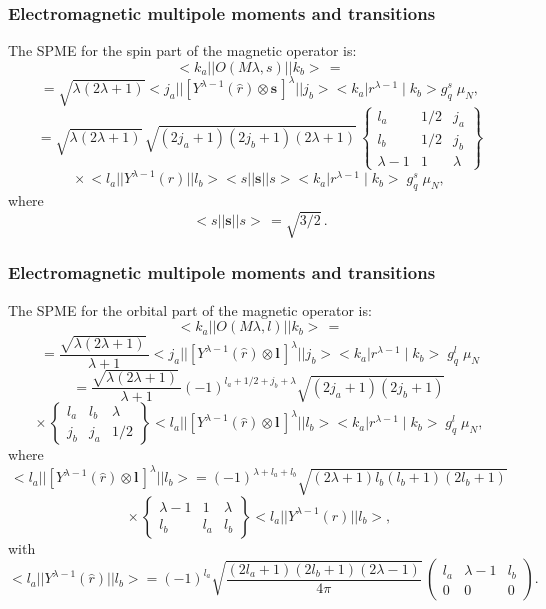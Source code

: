 \documentclass[compress]{beamer}
\renewcommand{\vec}[1]{\mathbf{#1}}
\renewcommand{\vec}[1]{\boldsymbol{#1}}
\begin{document}
\frame
{
\frametitle{Electromagnetic multipole moments and transitions}
\begin{small}
{\scriptsize
The SPME for the spin part of the magnetic operator is:
\[
<k_{a}||O(M\lambda ,s)||k_{b}>\, =
\]
\[
= \sqrt{\lambda (2\lambda +1)}<j_{a}||[Y^{\lambda -1}(\hat{r})\otimes\vec{s}\,]^{\lambda }||j_{b}>
<k_{a}|r^{\lambda -1}\mid k_{b}>g^{s}_{q} \; \mu _{N},
\]
\[
= \sqrt{\lambda (2\lambda +1)}\, \sqrt{(2j_{a}+1)(2j_{b}+1)(2\lambda +1)}\,
  \left\{\begin{array}{ccc}  {l _{a}}&  {1/2} & {j_{a}}\\  {l _{b}}&  {1/2} & {j_{b}}\\  {\lambda -1} & {1} & {\lambda}\end{array}\right\}
\]
\[
\times\,  <l _{a}||Y^{\lambda -1}(\hat{r})||l _{b}><s||\vec{s}||s>
<k_{a}|r^{\lambda -1}\mid k_{b}> \; g^{s}_{q} \; \mu _{N}
,
\]
where
\[
<s||\vec{s}||s>\, = \sqrt{3/2}\,.
\]

}
\end{small}
}
\frame
{
\frametitle{Electromagnetic multipole moments and transitions}
\begin{small}
{\scriptsize
The SPME for the orbital part of the magnetic operator is:
$$
<k_{a}||O(M\lambda ,l )||k_{b}>\, =
$$
$$
= \frac{\sqrt{\lambda (2\lambda +1)}\, }{\lambda +1}
<j_{a}||[Y^{\lambda -1}(\hat{r})\otimes\vec{l}\,]^{\lambda }||j_{b}>
<k_{a}|r^{\lambda -1}\mid k_{b}> \; g^{l }_{q} \; \mu _{N}
$$
$$
=\frac{\sqrt{\lambda (2\lambda +1)}\, }{\lambda +1}
(-1)^{l _{a}+1/2+j_{b}+\lambda } \sqrt{(2j_{a}+1)(2j_{b}+1)}\,
$$
$$
\times\,
 \left\{\begin{array}{ccc}  {l _{a}} &  {l _{b}} & {\lambda} \\  {j_{b}}&  {j_{a}}&  {1/2}\end{array}\right\}
<l _{a}||[Y^{\lambda -1}(\hat{r})\otimes\vec{l}\,]^{\lambda }||l _{b}>
<k_{a}|r^{\lambda -1}\mid k_{b}> \; g^{l }_{q} \; \mu _{N}
, 
$$
where
$$
<l _{a}||[Y^{\lambda -1}(\hat{r})\otimes\vec{l}\,]^{\lambda }||l _{b}>
=(-1)^{\lambda +l _{a}+l _{b}} \sqrt{(2\lambda +1)l _{b}(l _{b}+1)(2l _{b}+1)}\,
$$
$$
\times\,
    \left\{\begin{array}{ccc}  {\lambda -1} & {1}&  {\lambda}\\   {l _{b}}&  {l _{a}} &  {l _{b}} \end{array}\right\}
<l _{a}||Y^{\lambda -1}(\hat{r})||l _{b}>,
$$
with
$$
<l _{a}||Y^{\lambda -1}(\hat{r})||l _{b}>
=(-1)^{l _{a}} \sqrt{\frac{(2l _{a}+1)(2l _{b}+1)(2\lambda -1)}{4\pi }}\,
  \left(\begin{array}{ccc}  {l _{a}} & {\lambda -1} & {l _{b}}\\  {0} & {0}&  {0}\end{array}\right)
. 
$$
}
\end{small}
}
\end{document}
